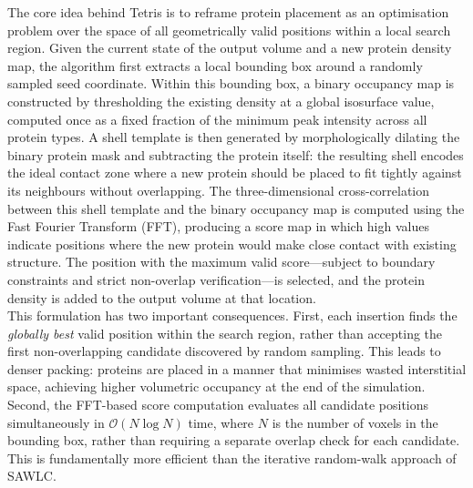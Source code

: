 The core idea behind Tetris is to reframe protein placement as an optimisation problem over
the space of all geometrically valid positions within a local search region. Given the current
state of the output volume and a new protein density map, the algorithm first extracts a local
bounding box around a randomly sampled seed coordinate. Within this bounding box, a binary
occupancy map is constructed by thresholding the existing density at a global isosurface value,
computed once as a fixed fraction of the minimum peak intensity across all protein types. A shell template is then generated by morphologically
dilating the binary protein mask and subtracting the protein itself: the resulting shell encodes
the ideal contact zone where a new protein should be placed to fit tightly against its neighbours
without overlapping. The three-dimensional cross-correlation between this shell template and the
binary occupancy map is computed using the Fast Fourier Transform (FFT), producing a score map
in which high values indicate positions where the new protein would make close contact with
existing structure. The position with the maximum valid score—subject to boundary constraints
and strict non-overlap verification—is selected, and the protein density is added to the output
volume at that location.\\

This formulation has two important consequences. First, each insertion finds the \textit{globally
best} valid position within the search region, rather than accepting the first non-overlapping
candidate discovered by random sampling. This leads to denser packing: proteins are placed in
a manner that minimises wasted interstitial space, achieving higher volumetric occupancy at the
end of the simulation. Second, the FFT-based score computation evaluates all candidate positions
simultaneously in $\mathcal{O}(N \log N)$ time, where $N$ is the number of voxels in the
bounding box, rather than requiring a separate overlap check for each candidate. This is
fundamentally more efficient than the iterative random-walk approach of SAWLC.\\

